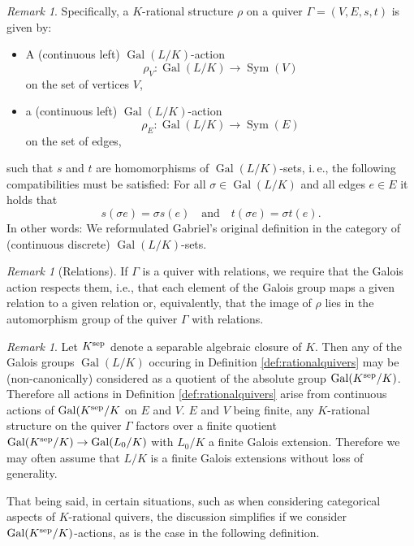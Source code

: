 \documentclass[a4paper,12pt,reqno]{amsart}
\DeclareMathOperator{\Gal}{\mathrm {Gal}}
\DeclareMathOperator{\Sym}{\mathrm {Sym}}
\theoremstyle{plain}
\theoremstyle{remark}
\newtheorem{remark}[theorem]{Remark}
\begin{document}
\begin{remark}
Specifically, a $K$-rational structure $\rho$ on a quiver $\Gamma=(V,E,s,t)$ is given by:
\begin{itemize}
\item[(i)] A (continuous left) $\Gal(L/K)$-action
  \[\rho_V\colon\Gal(L/K)\to\Sym(V)\] on the set of vertices $V$,
  \item[(ii)] a (continuous left) $\Gal(L/K)$-action \[\rho_E\colon\Gal(L/K)\to\Sym(E)\] on the set of edges,
\end{itemize}
such that $s$ and $t$ are homomorphisms of $\Gal(L/K)$-sets, i.\,e., the following compatibilities must be satisfied: For all $\sigma\in\Gal(L/K)$ and all edges $e\in E$ it holds that
\begin{equation}
  s(\sigma e)=\sigma s(e)\quad\text{and}\quad t(\sigma e)=\sigma t(e).
  \label{eq:stgaloisequivariance}
\end{equation}
In other words: We reformulated Gabriel's original definition in the category of (continuous discrete) $\Gal(L/K)$-sets.
\end{remark}

\begin{remark}[Relations]
  If $\Gamma$ is a quiver with relations, we require that the Galois action respects them, i.e., that each element of the Galois group maps a given relation to a given relation or, equivalently, that the image of $\rho$ lies in the automorphism group of the quiver $\Gamma$ with relations.
\end{remark}

\begin{remark}
  Let $K^{\rm sep}$ denote a separable algebraic closure of $K$. Then any of the Galois groups $\Gal(L/K)$ occuring in Definition \ref{def:rationalquivers} may be (non-canonically) considered as a quotient of the absolute group $\Gal(K^{\rm sep}/K)$. Therefore all actions in Definition \ref{def:rationalquivers} arise from continuous actions of $\Gal(K^{\rm sep}/K$ on $E$ and $V$. $E$ and $V$ being finite, any $K$-rational structure on the quiver $\Gamma$ factors over a finite quotient $\Gal(K^{\rm sep}/K)\to\Gal(L_0/K)$ with $L_0/K$ a finite Galois extension. Therefore we may often assume that $L/K$ is a finite Galois extensions without loss of generality.

  That being said, in certain situations, such as when considering categorical aspects of $K$-rational quivers, the discussion simplifies if we consider $\Gal(K^{\rm sep}/K)$-actions, as is the case in the following definition.
\end{remark}
\end{document}
